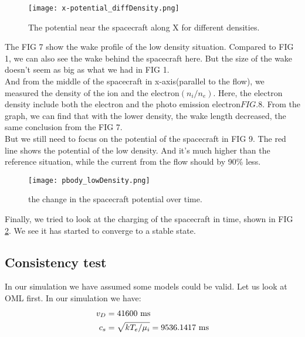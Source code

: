 \documentclass[aip, 
rsi, 
amsmath,
amssymb,
longbibliography,
preprint]{revtex4-1}
\begin{document}
\begin{figure}[!ht]
\texttt{[image: x-potential\_diffDensity.png]}
\caption{The potential near the spacecraft along X for different densities. \label{fig:end}}
\end{figure}

The FIG 7 show the wake profile of the low density situation. Compared to FIG 1, we can also see the wake behind the spacecraft here. But the size of the wake doesn't seem as big as what we had in FIG 1.\\

And from the middle of the spacecraft in x-axis(parallel to the flow), we measured the density of the ion and the electron$(n_i/n_e)$. Here, the electron density include both the electron and the photo emission electron\(FIG.8\). From the graph, we can find that with the lower density, the wake length decreased, the same conclusion from the FIG 7.\\

But we still need to focus on the potential of the spacecraft in FIG 9. The red line shows the potential of the low density. And it's much higher than the reference situation, while the current from the flow should by 90\% less.

\begin{figure}[!ht]
\texttt{[image: pbody\_lowDensity.png]}
\caption{the change in the spacecraft potential over time.\label{fig:DensityTime}}
\end{figure}

Finally, we tried to look at the charging of the spacecraft in time, shown in FIG \ref{fig:DensityTime}. We see it has started to converge to a stable state.

\subsection{Consistency test}

In our simulation we have assumed some models could be valid. Let us look at OML first. In our simulation we have:
\begin{align*}
v_D &= 41600 \, \, \text{m\/s}\\
c_s &= \sqrt{k T_e / \mu_i} = 9536.1417 \, \, \text{m\/s}
\end{align*}
\end{document}
